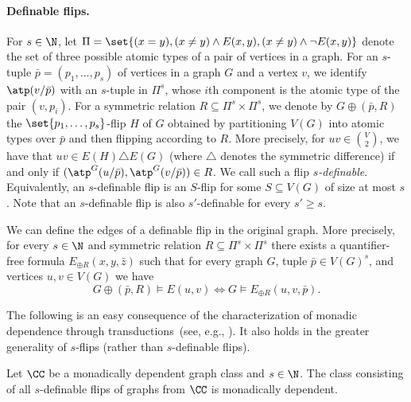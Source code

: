 \paragraph*{Definable flips.}
For $s \in \N$, let $\Pi=\set{(x=y), (x\neq y)\land E(x,y),(x\neq y)\land \neg E(x,y)}$ denote the set of three possible atomic types of a pair of vertices in a graph.
For an $s$-tuple $\bar p=(p_1,\ldots,p_s)$ of vertices in a graph $G$ and a vertex $v$,
we identify $\atp(v/\bar p)$ with an $s$-tuple in $\Pi^s$, whose $i$th component is the atomic type of the pair $(v,p_i)$.
For a symmetric relation $R \subseteq \Pi^s \times \Pi^s$, we denote by $G \oplus (\bar p, R)$ the $\set{p_1,\ldots,p_s}$-flip $H$ of $G$ obtained by partitioning $V(G)$ into atomic types over $\bar p$ and then flipping according to $R$.
More precisely, for $uv\in {V\choose 2}$,
we have that $uv\in E(H)\triangle E(G)$ (where $\triangle$ denotes the symmetric difference) if and only if $(\atp^G(u/\bar p), \atp^G(v/ \bar p)) \in R$.
We call such a flip \emph{$s$-definable}.
Equivalently, an $s$-definable flip is an $S$-flip for some $S\subseteq V(G)$ of size at most $s$.
Note that an $s$-definable flip is also $s'$-definable for every $s'\ge s$.

\begin{observation}\label{obs:sim-def-flip}
    We can define the edges of a definable flip in the original graph.
    More precisely, for every $s\in\N$ and symmetric relation $R \subseteq \Pi^s \times \Pi^s$ there exists a quantifier-free formula $E_{\oplus R}(x,y,\bar z)$ such that for every graph $G$, tuple $\bar p \in V(G)^s$, and vertices $u,v\in V(G)$ we have
    \[
        G\oplus(\bar p, R) \models E(u,v)
        \iff
        G \models E_{\oplus R}(u,v,\bar p).
    \]
\end{observation}

The following is an easy consequence of the characterization of monadic dependence through transductions~(see, e.g., \cite{flip-breakability}). It also holds in the greater generality of $s$-flips (rather than $s$-definable flips).
\begin{fact}\label{obs:flips-mon-dep}
    Let $\CC$ be a monadically dependent graph class and $s\in\N$.
    The class
    consisting of all $s$-definable flips of graphs from $\CC$ is monadically dependent.
\end{fact}

